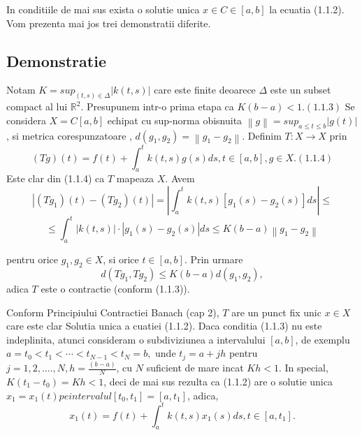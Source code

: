 \documentclass[a4paper,12pt,oneside]{report}
\begin{document}
In conditiile de mai sus exista o solutie unica \(x\in C\in \left [ a,b \right ]\) la ecuatia (1.1.2).
Vom prezenta mai jos trei demonstratii diferite.

\subsection{Demonstratie}

Notam \(K = sup_{\left ( t,s \right )\in \Delta }\left | k\left ( t,s \right ) \right |\) care este finite deoarece \(\Delta\) este un subset compact al lui \(\mathbb{R}^{2}\). Presupunem intr-o prima etapa ca 
\(K\left ( b-a \right ) < 1. (1.1.3)\)
Se considera \(X = C\left [ a,b \right ]\) echipat cu sup-norma obisnuita \(\left \| g \right \| = sup_{a\leq t\leq b}\left | g\left ( t \right ) \right |\),  si metrica corespunzatoare , \(d\left ( g_{1}, g_{2} \right ) = \left \| g_{1} - g_{2} \right \|\). 
Definim \(T : X \rightarrow X\) prin 
\begin{displaymath}
  \left ( Tg \right )\left ( t \right ) = f\left ( t \right ) + \int_{a}^{t}k\left ( t,s \right )g\left ( s \right )ds, t\in \left [ a,b \right ], g\in X. (1.1.4)
\end{displaymath}
	 Este clar din (1.1.4) ca \(T\) mapeaza \(X\). Avem
\begin{displaymath}
  \left | \left ( Tg_{1} \right )\left ( t \right ) - \left ( Tg_{2} \right )\left ( t \right )  \right | = \left | \int_{a}^{t}k\left ( t,s \right )\left [ g_{1}\left ( s \right ) - g_{2}\left ( s \right ) \right ]ds \right |\leq
\end{displaymath}
\begin{displaymath}
  \leq \int_{a}^{t}\left | k\left ( t,s \right ) \right |\cdot \left | g_{1}\left ( s \right ) - g_{2}\left ( s \right ) \right |ds \leq K \left ( b-a \right )\left \| g_{1} - g_{2} \right \|
\end{displaymath}


pentru orice \(g_{1}, g_{2} \in X\), si orice  \(t\in \left [ a,b \right ]\). 
Prin urmare 
\begin{displaymath}
  d\left ( Tg_{1} , Tg_{2}\right )\leq K\left ( b-a \right )d\left ( g_{1}, g_{2} \right ), 
\end{displaymath}
adica \(T\) este o contractie (conform (1.1.3)).


Conform Principiului Contractiei Banach (cap 2), \(T\) are un punct fix unic \(x \in  X\) care este clar Solutia unica a cuatiei (1.1.2).
	Daca conditia (1.1.3) nu este indeplinita, atunci consideram o subdiviziunea a intervalului \(\left [ a,b \right ]\), de exemplu 
\(a = t_{0}< t_{1}< \cdots < t_{N-1}< t_{N} = b,
\)
unde \(t_{j} = a + jh\) pentru \(j = 1,2,….,N, h = \frac{\left ( b-a \right )}{N}\), cu \(N\) suficient de mare incat \(Kh < 1\). In special, \(K\left ( t_{1}  - t_{0}\right ) = Kh< 1\), deci de mai sus rezulta ca (1.1.2) are o solutie unica \(x_{1} = x_{1}\left ( t \right ) pe intervalul \left [ t_{0} , t_{1} \right ] = \left [ a, t_{1} \right ]\), adica, 
\begin{displaymath}
  x_{1}\left ( t \right ) = f\left ( t \right ) + \int_{a}^{t}k\left ( t,s \right )x_{1}\left ( s \right )ds, t \in \left [ a, t_{1} \right ]. 
\end{displaymath}
\end{document}
